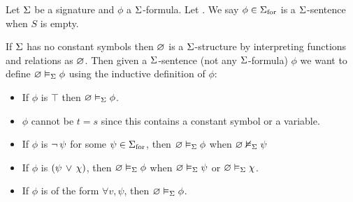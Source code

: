 \begin{dfn}
    Let $\Sigma$ be a signature and $\phi$ a $\Sigma$-formula.
    Let .
    We say $\phi \in {\Sigma}_\mathrm{for}$ is a $\Sigma$-sentence when $S$ is empty.

    If $\Sigma$ has no constant symbols then $\varnothing$ is a $\Sigma$-structure
    by interpreting functions and relations as $\varnothing$.
    Then given a $\Sigma$-sentence (not any $\Sigma$-formula) $\phi$ we 
    want to define $\varnothing \vDash_{\Sigma} \phi$
    using the inductive definition of $\phi$:
    \begin{itemize}
        \item If $\phi$ is $\top$ then $\varnothing \vDash_{\Sigma} \phi$.
        \item $\phi$ cannot be $t = s$ since this contains a constant
            symbol or a variable.
            \vspace{1em}
        \item If $\phi$ is 
            $\neg\, \psi$ for some $\psi \in {\Sigma}_\mathrm{for}$, 
            then $\varnothing \vDash_{\Sigma} \phi$ when $\varnothing \nvDash_{\Sigma} \psi$
        \item If $\phi$ is $(\psi \, \lor \, \chi)$, 
            then $\varnothing \vDash_{\Sigma} \phi$ when 
            $\varnothing \vDash_{\Sigma} \psi$ or $\varnothing \vDash_{\Sigma} \chi$.
        \item If $\phi$ is of the form
            $\forall v, \psi$, then $\varnothing \vDash_{\Sigma} \phi$.
    \end{itemize}


\end{dfn}
